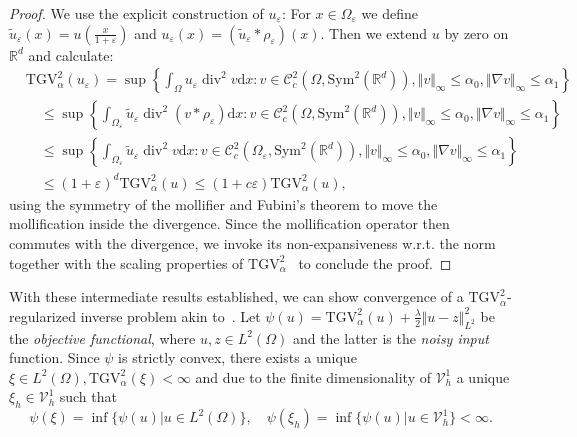 \documentclass{article}
\DeclareMathOperator{\Div}{div}
\newcommand{\dx}{\mathrm{d}}
\newcommand{\R}{\mathbb{R}}
\newcommand{\TGV}{\mathrm{TGV}}
\begin{document}
	\begin{proof}
		We use the explicit construction of $u_\varepsilon$:
		For $x \in \Omega_\varepsilon$ we define $\tilde{u}_\varepsilon(x) = u(\frac{x}{1+\varepsilon})$ and $u_\varepsilon(x) = \left(\tilde{u}_\varepsilon * \rho_\varepsilon \right)(x)$.
		Then we extend $u$ by zero on $\R^d$ and calculate:
		\begin{align*}
			&\TGV_{\alpha}^2(u_\varepsilon)=\sup \left \lbrace  \int_\Omega u_\varepsilon  \Div^2v \dx x\colon v \in \mathcal{C}_c^2(\Omega, \mathrm{Sym}^2(\R^d)), \Vert v\Vert _\infty \leq \alpha_0, \Vert \nabla v\Vert _\infty \leq \alpha_1\right \rbrace\\
			&\quad\leq \sup \left \lbrace  \int_{\Omega_\varepsilon} \tilde{u}_\varepsilon \Div^2(v * \rho_\varepsilon) \dx x\colon v \in \mathcal{C}_c^2(\Omega, \mathrm{Sym}^2(\R^d)), \Vert v\Vert _\infty \leq \alpha_0, \Vert \nabla v\Vert _\infty \leq \alpha_1\right \rbrace\\
			&\quad\leq \sup \left \lbrace  \int_{\Omega_\varepsilon} \tilde{u}_\varepsilon \Div^2v \dx x\colon v \in \mathcal{C}_c^2(\Omega_\varepsilon, \mathrm{Sym}^2(\R^d)), \Vert v\Vert _\infty \leq \alpha_0, \Vert \nabla v\Vert _\infty \leq \alpha_1\right \rbrace\\
			&\quad\leq (1+\varepsilon)^d \TGV_{\alpha}^2(u) \leq (1 + c\varepsilon) \TGV_{\alpha}^2(u),
		\end{align*}
		using the symmetry of the mollifier and Fubini’s theorem to move the mollification inside the divergence. Since the mollification operator then commutes with the divergence, we invoke its non-expansiveness w.r.t. the norm together with the scaling properties of $\TGV_\alpha^2$~\cite[Proposition~3.3]{Br10} to conclude the proof.
	\end{proof}
	
	With these intermediate results established, we can show convergence of a $\TGV_\alpha^2$-regularized inverse problem akin to~\cite[Theorem~7.1]{Ba14}.
	Let $\psi(u) =  \TGV_{\alpha}^2(u) + \frac{\lambda}{2}\Vert u - z\Vert _{L^2}^2$ be the \emph{objective functional}, where $u,z\in L^2(\Omega)$ and the latter is the \emph{noisy input} function.
	Since $\psi$ is strictly convex, there exists a unique $\xi \in L^2(\Omega),\TGV_{\alpha}^2(\xi) < \infty$ and due to the finite dimensionality of $\mathcal{V}_h^1$ a unique $\xi_h \in \mathcal{V}_h^1$ such that 
	\begin{equation}
		\label{def:contTGVdenoiseMin}
		\psi(\xi) = \inf \lbrace \psi(u) \rvert u \in L^2(\Omega)\rbrace, \quad \psi(\xi_h) = \inf \lbrace \psi(u) \rvert u \in \mathcal{V}_h^1\rbrace  < \infty.
	\end{equation}
	
\end{document}
